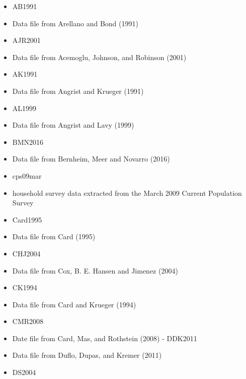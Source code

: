 \documentclass[10pt]{article}
\begin{document}
\begin{itemize}
  \item AB1991

  \item Data file from Arellano and Bond (1991)

  \item AJR2001

  \item Data file from Acemoglu, Johnson, and Robinson (2001)

  \item AK1991

  \item Data file from Angrist and Krueger (1991)

  \item AL1999

  \item Data file from Angrist and Lavy (1999)

  \item BMN2016

  \item Data file from Bernheim, Meer and Novarro (2016)

  \item cps09mar

  \item household survey data extracted from the March 2009 Current Population Survey

  \item Card1995

  \item Data file from Card (1995)

  \item CHJ2004

  \item Data file from Cox, B. E. Hansen and Jimenez (2004)

  \item CK1994

  \item Data file from Card and Krueger (1994)

  \item CMR2008

  \item Date file from Card, Mas, and Rothstein (2008) - DDK2011

  \item Data file from Duflo, Dupas, and Kremer (2011)

  \item DS2004


\end{itemize}
\end{document}
